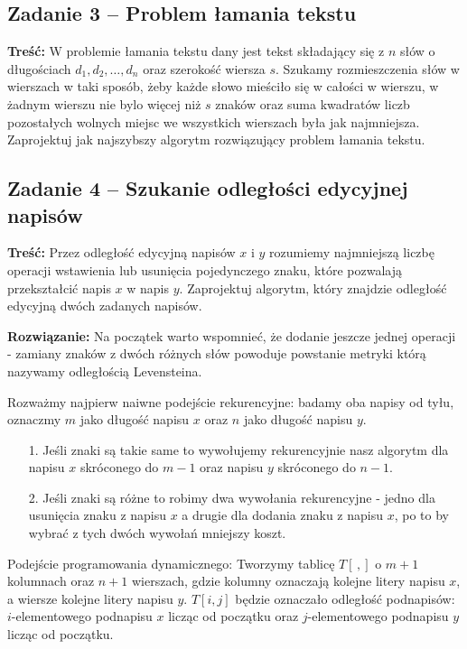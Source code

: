 \subsection{Zadanie 3 -- Problem łamania tekstu}
\textbf{Treść:} W problemie łamania tekstu dany jest tekst składający się z $n$
słów o długościach $d_1, d_2, \ldots , d_n$ oraz
szerokość wiersza $s$. Szukamy rozmieszczenia słów w wierszach w taki 
sposób, żeby każde słowo mieściło się w całości
w wierszu, w żadnym wierszu nie bylo więcej niż $s$ znaków 
oraz suma kwadratów liczb pozostałych wolnych miejsc we
wszystkich wierszach była jak najmniejsza.
Zaprojektuj jak najszybszy algorytm rozwiązujący problem łamania tekstu.
\subsection{Zadanie 4 -- Szukanie odległości edycyjnej napisów}
\textbf{Treść:} Przez odległość edycyjną napisów 
$x$ i $y$ rozumiemy najmniejszą liczbę operacji wstawienia lub usunięcia
pojedynczego znaku, które pozwalają przekształcić napis $x$ w napis $y$.
Zaprojektuj algorytm, który znajdzie odległość 
edycyjną dwóch zadanych napisów.

\textbf{Rozwiązanie:}
Na początek warto wspomnieć, że dodanie jeszcze jednej operacji - 
zamiany znaków z dwóch różnych słów powoduje powstanie metryki
którą nazywamy odległością Levensteina.

Rozważmy najpierw naiwne podejście rekurencyjne: badamy 
oba napisy od tyłu, oznaczmy $m$ jako długość napisu $x$
oraz $n$ jako długość napisu $y$. 
\begin{itemize}
	\item[1.] Jeśli znaki są takie same to wywołujemy rekurencyjnie
	nasz algorytm dla napisu $x$ skróconego do $m - 1$ oraz 
	napisu $y$ skróconego do $n - 1$.
	\item[2.] Jeśli znaki są różne to robimy dwa wywołania 
	rekurencyjne - jedno dla usunięcia znaku z napisu $x$ 
	a drugie dla dodania znaku z napisu $x$, po 
	to by wybrać z tych dwóch wywołań mniejszy koszt.
\end{itemize}


Podejście programowania dynamicznego: Tworzymy tablicę $T[\,,]$ o
$m + 1$ kolumnach oraz $n + 1$ wierszach,
gdzie kolumny oznaczają kolejne litery napisu $x$, a
wiersze kolejne litery napisu $y$. 
$T[i, j]$ będzie oznaczało odległość podnapisów:
$i$-elementowego podnapisu $x$ licząc od początku oraz 
$j$-elementowego podnapisu $y$ licząc od początku.

